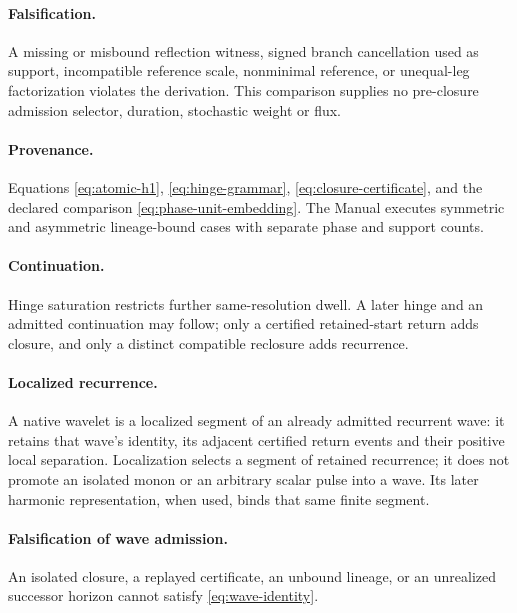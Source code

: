 \paragraph{Falsification.}
A missing or misbound reflection witness, signed branch cancellation used as
support, incompatible reference scale, nonminimal reference, or unequal-leg
factorization violates the derivation. This comparison supplies no pre-closure
admission selector, duration, stochastic weight or flux.

\paragraph{Provenance.}
Equations \eqref{eq:atomic-h1}, \eqref{eq:hinge-grammar},
\eqref{eq:closure-certificate}, and the declared comparison
\eqref{eq:phase-unit-embedding}. The Manual executes symmetric and asymmetric
lineage-bound cases with separate phase and support counts.

\paragraph{Continuation.}
\label{app:wave:fractal-growth-temporal-direction}
Hinge saturation restricts further same-resolution dwell. A later hinge and
an admitted continuation may follow; only a certified retained-start return
adds closure, and only a distinct compatible reclosure adds recurrence.
\paragraph{Localized recurrence.}
\label{subsec:localized-wavelet}
A native wavelet is a localized segment of an already admitted recurrent wave:
it retains that wave's identity, its adjacent certified return events and their
positive local separation. Localization selects a segment of retained recurrence;
it does not promote an isolated monon or an arbitrary scalar pulse into a wave.
Its later harmonic representation, when used, binds that same finite segment.
\paragraph{Falsification of wave admission.}
\label{app:wave:falsification}
An isolated closure, a replayed certificate, an unbound lineage, or an
unrealized successor horizon cannot satisfy \eqref{eq:wave-identity}.
